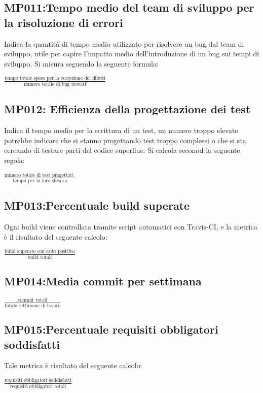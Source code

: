\subsection{MP011:Tempo medio del team di sviluppo per la risoluzione di errori}
Indica la quantità di tempo medio utilizzato per risolvere un bug dal team di sviluppo, utile per capire l'impatto medio dell'introduzione di un bug sui tempi di sviluppo. Si misura seguendo la seguente formula:
\begin{center}
	\vspace{1em}
	$\frac{\mbox{tempo totale speso per la correzione dei difetti}}{\mbox{numero totale di bug trovati}}$
\end{center}


\subsection{MP012: Efficienza della progettazione dei test}
Indica il tempo medio per la scrittura di un test, un numero troppo elevato potrebbe indicare che si stanno progettando test troppo complessi  o che si sta cercando di testare  parti del codice superflue. Si calcola seconod la seguente regola:
\begin{center}
	\vspace{1em}
	$\frac{\mbox{numero totale di test progettati }}{\mbox{tempo per la loro stesura}}$\\
\end{center}


\subsection{MP013:Percentuale build superate}
Ogni build viene controllata tramite script automatici con Travis-CI, e la metrica è il risultato del seguente calcolo:
\begin{center}
$\frac{\mbox{build superate con esito positivo}}{\mbox{build totali}}$
\end{center}


\subsection{MP014:Media commit per settimana}
\begin{center}
	$\frac{\mbox{commit totali}}{\mbox{totale settimane di lavoro}}$
\end{center}


\subsection{MP015:Percentuale requisiti obbligatori soddisfatti}
 Tale metrica è risultato del seguente calcolo:
 \begin{center}
 	$\frac{\mbox{requisiti obbligatori soddisfatti}}{\mbox{requisiti obbligatori totali}}$
 \end{center}

